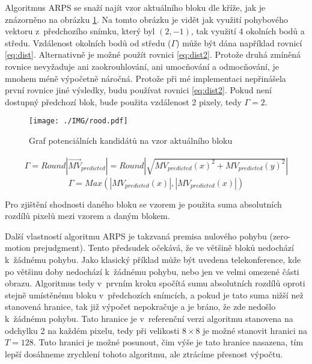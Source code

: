 \documentclass[thesis=M,czech]{FITthesis}[2016/06/26]
\begin{document}
Algoritmus ARPS se snaží najít vzor aktuálního bloku dle kříže, jak je znázorněno na obrázku \ref{fig:rood}. Na tomto obrázku je vidět jak využití pohybového vektoru z~předchozího snímku, který byl $(2,-1)$, tak využití 4  okolních bodů a středu. Vzdálenost okolních bodů od středu ($\Gamma$) může být dána například rovnicí \ref{eq:dist}. Alternativně je možné použít rovnici \ref{eq:dist2}. Protože druhá zmíněná rovnice nevyžaduje ani zaokrouhlování, ani umocňování a odmocňování, je mnohem méně výpočetně náročná. Protože při mé implementaci nepřinášela první rovnice jiné výsledky, budu používat rovnici \ref{eq:dist2}. Pokud není dostupný předchozí blok, bude použita vzdálenost 2 pixely, tedy $\Gamma=2$.
\begin{figure}[h]\centering
\texttt{[image: ./IMG/rood.pdf]}
\caption{Graf potenciálních kandidátů na vzor aktuálního bloku}
\label{fig:rood}
\end{figure}
\begin{multline}\label{eq:dist}
\Gamma = \mathit{Round}\left|\overrightarrow{MV}_{predicted}\right| =\mathit{Round}\left|\sqrt{MV_{predicted}(x)^2+MV_{predicted}(y)^2}\right|
\end{multline}
\begin{equation}\label{eq:dist2}
\Gamma = \mathit{Max}(\left|MV_{predicted}(x)\right|,\left|MV_{predicted}(x)\right|)
\end{equation}

Pro zjištění shodnosti daného bloku se vzorem je použita suma absolutních rozdílů pixelů mezi vzorem a daným blokem. 

Další vlastností algoritmu ARPS je takzvaná premisa nulového pohybu (zero-motion prejudgment). Tento předsudek očekává, že ve většině bloků nedochází k~žádnému pohybu. Jako klasický příklad může být uvedena telekonference, kde po většinu doby nedochází k~žádnému pohybu, nebo jen ve velmi omezené části obrazu. Algoritmus tedy v~prvním kroku spočítá sumu absolutních rozdílů oproti stejně umístěnému bloku v~předchozích snímcích, a pokud je tato suma nižší než stanovená hranice, tak již výpočet nepokračuje a je bráno, že zde nedošlo k~žádnému pohybu. Tato hranice je v~referenční verzi algoritmu stanovena na odchylku 2 na každém pixelu, tedy při velikosti $8 \times 8$ je možné stanovit hranici na $T=128$. Tuto hranici je možné posunout, čim výše je tato hranice nasazena, tím lepší dosáhneme zrychlení tohoto algoritmu, ale ztrácíme přesnost výpočtu.
\end{document}
